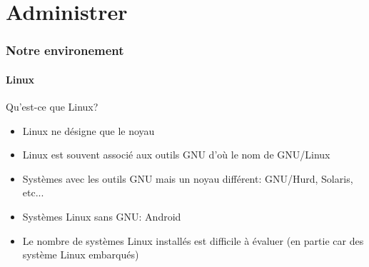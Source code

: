 %
%

\part{Administrer}

\begin{frame}
  \partpage
\end{frame}

\begin{frame}
  \tableofcontents[currentpart]
\end{frame}

\section{Notre environement}

\subsection{Linux}

\begin{frame}{Qu'est-ce que Linux?}
  \begin{itemize}
  \item  Linux ne désigne  que le  noyau
  \item  Linux est  souvent  associé aux  outils  GNU d'où  le nom  de
    GNU/Linux
  \item  Systèmes  avec  les  outils  GNU  mais  un  noyau  différent:
    GNU/Hurd, Solaris, etc...
  \item Systèmes Linux sans GNU: Android
  \item Le nombre de systèmes  Linux installés est difficile à évaluer
    (en partie car des système Linux embarqués)
  \end{itemize}
\end{frame}


